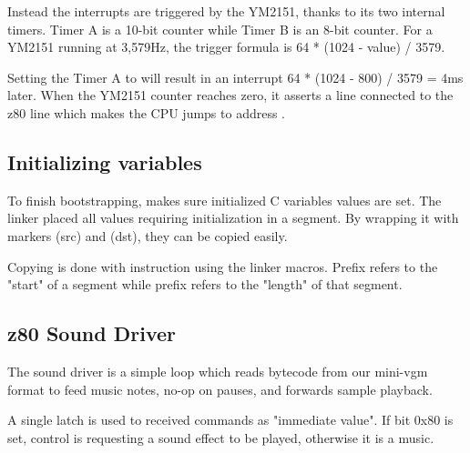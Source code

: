 Instead the interrupts are triggered by the YM2151, thanks to its two internal timers. Timer A is a 10-bit counter while Timer B is an 8-bit counter. For a YM2151 running at 3,579Hz, the trigger formula is 64 * (1024 - value) / 3579.

Setting the Timer A to  will result in an interrupt 64 * (1024 - 800) / 3579 = 4ms later. When the YM2151 counter reaches zero, it asserts a line connected to the z80  line which makes the CPU jumps to address .








\subsection{Initializing variables}
To finish bootstrapping,  makes sure initialized C variables values are set. The linker placed all values requiring initialization in a  segment. By wrapping it with markers  (src) and  (dst), they can be copied easily.



Copying is done with  instruction using the linker macros. Prefix  refers to the "start" of a segment while prefix  refers to the "length" of that segment.


 



\subsection{z80 Sound Driver}
The sound driver is a simple loop which reads bytecode from our mini-vgm format to feed music notes, no-op on pauses, and forwards sample playback. 




A single latch is used to received commands as "immediate value". If bit 0x80 is set, control is requesting a sound effect to be played, otherwise it is a music. 

